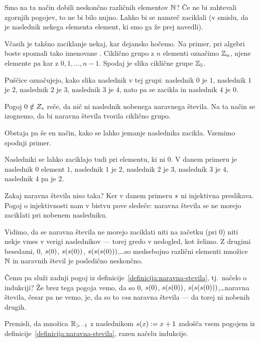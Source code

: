 Smo na ta način dobili neskončno različnih elementov $\mathbb{N}$? Če ne bi zahtevali zgornjih pogojev, to ne bi bilo nujno. Lahko bi se namreč zaciklali (v smislu, da je naslednik nekega elementa element, ki smo ga že prej navedli).

Včasih je takšno zaciklanje nekaj, kar dejansko hočemo. Na primer, pri algebri boste spoznali tako imenovane . Ciklično grupo z $n$ elementi označimo $\mathbb{Z}_n$, njene elemente pa kar z $0, 1, \ldots, n-1$. Spodaj je slika ciklične grupe $\mathbb{Z}_5$.


Puščice označujejo, kako slika naslednik v tej grupi: naslednik $0$ je $1$, naslednik $1$ je $2$, naslednik $2$ je $3$, naslednik $3$ je $4$, nato pa se zacikla in naslednik $4$ je $0$.

Pogoj $0 \notin \rn{\suc}$ reče, da nič ni naslednik nobenega naravnega števila. Na ta način se izognemo, da bi naravna števila tvorila ciklično grupo.

Obstaja pa še en način, kako se lahko jemanje naslednika zacikla. Vzemimo spodnji primer.


Nasledniki se lahko zaciklajo tudi pri elementu, ki ni $0$. V danem primeru je naslednik $0$ element $1$, naslednik $1$ je $2$, naslednik $2$ je $3$, naslednik $3$ je $4$, naslednik $4$ pa je $2$.

Zakaj naravna števila niso taka? Ker v danem primeru $\suc$ ni injektivna preslikava. Pogoj o injektivnosti nam v bistvu pove sledeče: naravna števila se ne morejo zaciklati pri nobenem nasledniku.

Vidimo, da se naravna števila ne morejo zaciklati niti na začetku (pri $0$) niti nekje vmes v verigi naslednikov --- torej gredo v nedogled, kot želimo. Z drugimi besedami, $0$, $\suc[0]$, $\suc(\suc[0])$, $\suc(\suc(\suc[0]))$,\ldots so medsebojno različni elementi množice $\mathbb{N}$ in naravnih števil je posledično neskončno.

Čemu pa služi zadnji pogoj iz definicije~\ref{definicija:naravna-stevila}, tj.~načelo o indukciji? Že brez tega pogoja vemo, da so $0$, $\suc[0]$, $\suc(\suc[0])$, $\suc(\suc(\suc[0]))$,\ldots naravna števila, česar pa ne vemo, je, da so to \emph{vsa} naravna števila --- da torej ni nobenih drugih.

\begin{vaja}
Premisli, da množica $\mathbb{R}_{> -1}$ z naslednikom $\suc[x] \dfeq x+1$ zadošča vsem pogojem iz definicije~\ref{definicija:naravna-stevila}, razen načelu indukcije.
\end{vaja}

